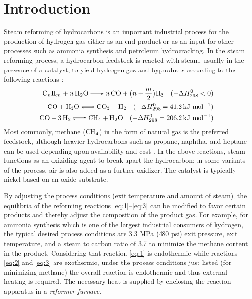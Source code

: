 \chapter{Introduction} \label{ch:introduction}

Steam reforming of hydrocarbons is an important industrial process for the production of hydrogen gas either as an end product or as an input for other processes such as ammonia synthesis and petroleum hydrocracking. In the steam reforming process, a hydrocarbon feedstock is reacted with steam, usually in the presence of a catalyst, to yield hydrogen gas and byproducts according to the following reactions \cite{rostrup-nielsen_catalytic_1984}:
\begin{align}
\ce{C_{n}H_{m} + n H2O -> n CO + } \bigl(n + \frac{m}{2}\bigr) \ce{H2} \quad (-\Delta{}H^{0}_{298} < 0) \label{eq:1} \\
\ce{CO + H2O <=> CO2 + H2} \quad (-\Delta{}H^{0}_{298} = 41.2 \, \text{kJ mol}^{-1}) \label{eq:2} \\
\ce{CO + 3H2 <=> CH4 + H2O} \quad (-\Delta{}H^{0}_{298} = 206.2 \, \text{kJ mol}^{-1}) \label{eq:3}
\end{align}
Most commonly, methane (CH$_{\textnormal{4}}$) in the form of natural gas is the preferred feedstock, although heavier hydrocarbons such as propane, naphtha, and heptane can be used depending upon availability and cost \cite{rostrup-nielsen_catalytic_1984,haussinger_hydrogen_2000}. In the above reactions, steam functions as an oxiziding agent to break apart the hydrocarbon; in some variants of the process, air is also added as a further oxidizer. The catalyst is typically nickel-based on an oxide substrate.

By adjusting the process conditions (exit temperature and amount of steam), the equilibria of the reforming reactions \ref{eq:1}--\ref{eq:3} can be modified to favor certain products and thereby adjust the composition of the product gas. For example, for ammonia synthesis which is one of the largest industrial consumers of hydrogen, the typical desired process conditions are 3.3 MPa (480 psi) exit pressure,  exit temperature, and a steam to carbon ratio of 3.7 \cite{rostrup-nielsen_catalytic_1984} to minimize the methane content in the product. Considering that reaction \ref{eq:1} is endothermic while reactions \ref{eq:2} and \ref{eq:3} are exothermic, under the process conditions just listed (for minimizing methane) the overall reaction is endothermic and thus external heating is required. The necessary heat is supplied by enclosing the reaction apparatus in a \emph{reformer furnace}.

